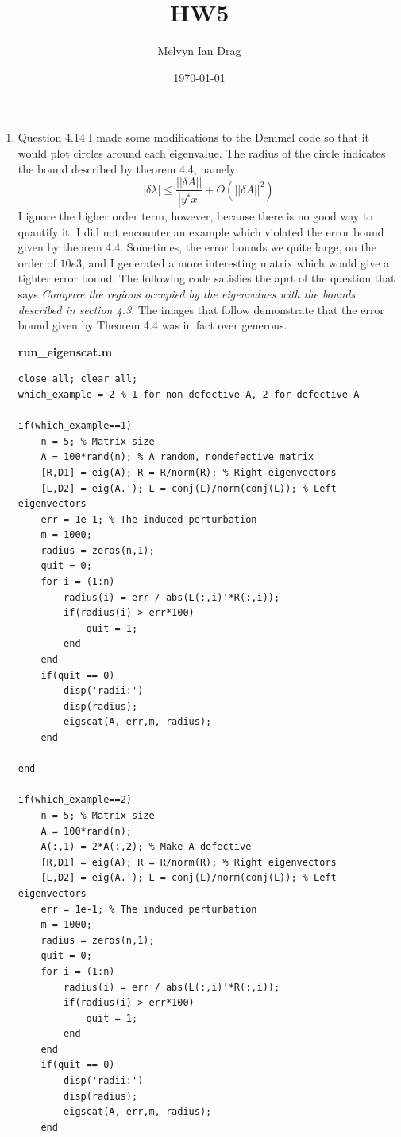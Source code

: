 \documentclass[a4paper]{article}
\title{HW5}
\author{Melvyn Ian Drag}
\date{\today}
\begin{document}
\maketitle

\begin{enumerate}
\item Question 4.14
I made some modifications to the Demmel code so that it would plot circles around each eigenvalue. The radius of the circle indicates the bound described by theorem 4.4, namely:
\begin{equation}
|\delta\lambda| \le \frac{||\delta A||}{|y^*x|} + O(||\delta A||^2)
\end{equation}
I ignore the higher order term, however, because there is no good way to quantify it. I did not encounter an example which violated the error bound given by theorem 4.4. Sometimes, the error bounds we quite large, on the order of $10e3$, and I generated a more interesting matrix which would give a tighter error bound. 
The following code satisfies the aprt of the question that says \emph{Compare the regions occupied by the eigenvalues with the bounds described in section 4.3.} The images that follow demonstrate that the error bound given by Theorem 4.4 was in fact over generous.
\begin{center}
\textbf{run\_eigenscat.m}
\begin{lstlisting}
close all; clear all;
which_example = 2 % 1 for non-defective A, 2 for defective A

if(which_example==1)    
    n = 5; % Matrix size
    A = 100*rand(n); % A random, nondefective matrix
    [R,D1] = eig(A); R = R/norm(R); % Right eigenvectors
    [L,D2] = eig(A.'); L = conj(L)/norm(conj(L)); % Left eigenvectors
    err = 1e-1; % The induced perturbation
    m = 1000;
    radius = zeros(n,1);
    quit = 0;
    for i = (1:n)
        radius(i) = err / abs(L(:,i)'*R(:,i));
        if(radius(i) > err*100)
            quit = 1;
        end
    end
    if(quit == 0)
        disp('radii:')
        disp(radius);
        eigscat(A, err,m, radius);
    end
    
end

if(which_example==2)
    n = 5; % Matrix size
    A = 100*rand(n);
    A(:,1) = 2*A(:,2); % Make A defective
    [R,D1] = eig(A); R = R/norm(R); % Right eigenvectors
    [L,D2] = eig(A.'); L = conj(L)/norm(conj(L)); % Left eigenvectors
    err = 1e-1; % The induced perturbation
    m = 1000;
    radius = zeros(n,1);
    quit = 0;
    for i = (1:n)
        radius(i) = err / abs(L(:,i)'*R(:,i));
        if(radius(i) > err*100)
            quit = 1;
        end
    end
    if(quit == 0)
        disp('radii:')
        disp(radius);
        eigscat(A, err,m, radius);
    end
    

\end{lstlisting}
\end{center}
\end{enumerate}
\end{document}
